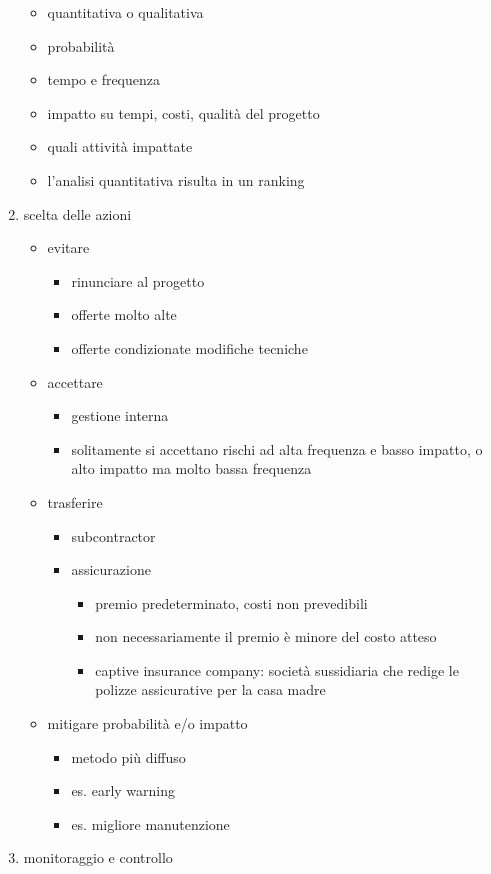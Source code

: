 \documentclass[answers, a4paper, 11pt]{exam}
\begin{document}
\begin{enumerate}
    \begin{itemize}
        \item quantitativa o qualitativa
        \item probabilità
        \item tempo e frequenza
        \item impatto su tempi, costi, qualità del progetto
        \item quali attività impattate
        \item l'analisi quantitativa risulta in un ranking
    \end{itemize}
    \item scelta delle azioni
    \begin{itemize}
        \item evitare
        \begin{itemize}
            \item rinunciare al progetto
            \item offerte molto alte
            \item offerte condizionate
            \itme modifiche tecniche
        \end{itemize}
        \item accettare
        \begin{itemize}
            \item gestione interna
            \item solitamente si accettano rischi ad alta frequenza e basso impatto, o alto impatto ma molto bassa frequenza 
        \end{itemize}
        \item trasferire
        \begin{itemize}
            \item subcontractor
            \item assicurazione
            \begin{itemize}
                \item premio predeterminato, costi non prevedibili
                \item non necessariamente il premio è minore del costo atteso
                \item captive insurance company: società sussidiaria che redige le polizze assicurative per la casa madre
            \end{itemize}
        \end{itemize}
        \item mitigare probabilità e/o impatto
        \begin{itemize}
            \item metodo più diffuso
            \item es. early warning
            \item es. migliore manutenzione
        \end{itemize}
    \end{itemize}
    \item monitoraggio e controllo
\end{enumerate}
\end{document}
